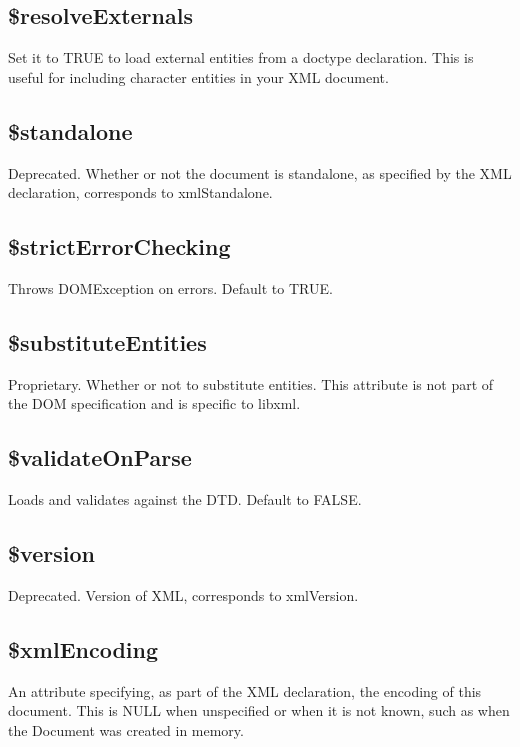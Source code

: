 \subsection{\$resolveExternals}

Set it to TRUE to load external entities from a doctype declaration. This is useful for including character entities in your XML document.

\subsection{\$standalone}

Deprecated. Whether or not the document is standalone, as specified by the XML declaration, corresponds to xmlStandalone.

\subsection{\$strictErrorChecking}

Throws DOMException on errors. Default to TRUE.

\subsection{\$substituteEntities}

Proprietary. Whether or not to substitute entities. This attribute is not part of the DOM specification and is specific to libxml.

\subsection{\$validateOnParse}

Loads and validates against the DTD. Default to FALSE.

\subsection{\$version}

Deprecated. Version of XML, corresponds to xmlVersion.

\subsection{\$xmlEncoding}

An attribute specifying, as part of the XML declaration, the encoding of this document. This is NULL when unspecified or when it is not known, such as when the Document was created in memory.

